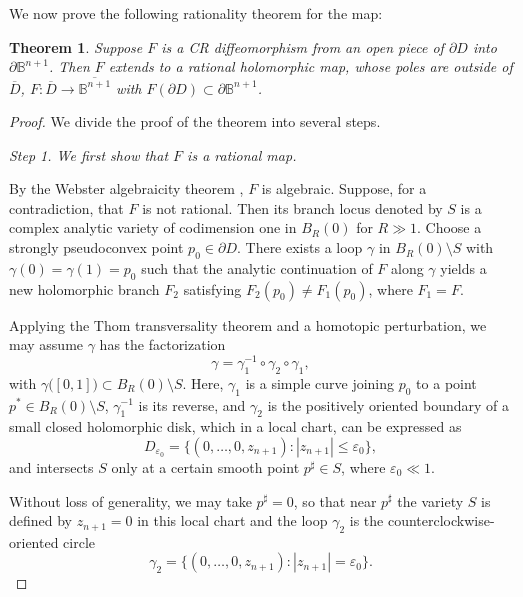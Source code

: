 \documentclass[a4paper,centertags,oneside,12pt]{amsart}
\newcommand{\sm}{\setminus}
\newtheorem{theorem}{Theorem}[section]
\numberwithin{equation}{section}
\begin{document}
We now prove the following rationality theorem for the map:
\begin{theorem}\label{thm1-2-26}
    Suppose $F$ is a CR diffeomorphism from an open piece of $\partial D$ into $\partial \mathbb B^{n+1}$. Then $F$ extends to a rational holomorphic  map, whose   poles  are outside of $\overline D$,  $F:\overline  D\rightarrow \overline {\mathbb B^{n+1}}$ with $F(\partial D)\subset\partial \mathbb B^{n+1}$. 
\end{theorem}
\begin{proof}
We divide the proof of the theorem into several steps.

 \textit{Step 1. We first show that \(F\) is a rational map.} 

 By the Webster algebraicity theorem \cite{We77, Hu94},  \(F\) is algebraic. Suppose, for a contradiction, that  \(F\) is not rational. Then its branch locus denoted by $S$ is a complex analytic variety of codimension one in $B_R(0)$ for $R\gg1$. Choose a strongly pseudoconvex point $p_0\in\partial D$. There exists a loop \(\gamma\) in \(B_R(0)\setminus S\)   with \(\gamma(0)=\gamma(1)=p_0\) such that the analytic continuation of  \(F\)  along  \(\gamma\) yields a new holomorphic branch 
  \(F_2\) satisfying \(F_2(p_0) \neq F_1(p_0)\), where \(F_1=F\).



Applying the Thom transversality theorem and a homotopic perturbation, we may assume \(\gamma\) has the factorization
\[
\gamma = \gamma_1^{-1} \circ \gamma_2 \circ \gamma_1,
\]
with \(\gamma\bigl([0,1]\bigr) \subset B_R(0) \setminus S\). Here, \(\gamma_1\) is a simple curve joining \(p_0\) to a point \(p^*\in B_R(0)\sm S\), \(\gamma_1^{-1}\) is its reverse, and \(\gamma_2\) is the positively oriented boundary of a small closed  holomorphic disk, which in a local chart, can be expressed as
\[
D_{\varepsilon_0} = \{(0,\dots,0,z_{n+1}): |z_{n+1}| \le  \varepsilon_0\},
\]
and intersects $S$  only at a certain  smooth point $p^\sharp\in S$, where \(\varepsilon_0 \ll 1\). 


Without loss of generality, we may take \(p^\sharp = 0\), so that near \(p^\sharp\) the variety \(S\) is defined by \(z_{n+1} = 0\) in this local chart and the loop \(\gamma_2\) is the counterclockwise-oriented circle
\[
\gamma_2 = \{(0,\dots,0,z_{n+1}): |z_{n+1}| = \varepsilon_0\}.
\]


\end{proof}
\end{document}
